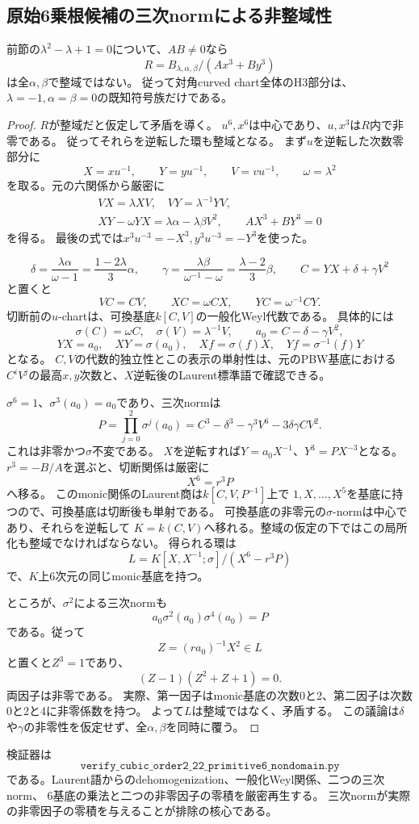 \subsection{原始6乗根候補の三次normによる非整域性}
\label{subsec:h3-order2-22-primitive6-nondomain}
\begin{theorem}\label{thm:h3-order2-22-primitive6-nondomain}
前節の$\lambda^2-\lambda+1=0$について、$AB\ne0$なら
\[
 R=B_{\lambda,\alpha,\beta}/(A x^3+B y^3)
\]
は全$\alpha,\beta$で整域ではない。
従って対角curved chart全体のH3部分は、$\lambda=-1,\alpha=\beta=0$の既知符号族だけである。
\end{theorem}
\begin{proof}
$R$が整域だと仮定して矛盾を導く。
$u^6,x^6$は中心であり、$u,x^3$は$R$内で非零である。
従ってそれらを逆転した環も整域となる。
まず$u$を逆転した次数零部分に
\[
 X=xu^{-1},\qquad Y=yu^{-1},\qquad V=vu^{-1},\qquad\omega=\lambda^2
\]
を取る。元の六関係から厳密に
\begin{gather*}
 VX=\lambda XV,\quad VY=\lambda^{-1}YV,\\
 XY-\omega YX=\lambda\alpha-\lambda\beta V^2,\qquad
 A X^3+B Y^3=0
\end{gather*}
を得る。
最後の式では$x^3u^{-3}=-X^3,y^3u^{-3}=-Y^3$を使った。

\[
 \delta=\frac{\lambda\alpha}{\omega-1}
       =\frac{1-2\lambda}{3}\alpha,\qquad
 \gamma=\frac{\lambda\beta}{\omega^{-1}-\omega}
       =\frac{\lambda-2}{3}\beta,
 \qquad C=YX+\delta+\gamma V^2
\]
と置くと
\[
 VC=CV,\qquad XC=\omega CX,\qquad YC=\omega^{-1}CY.
\]
切断前の$u$-chartは、可換基底$k[C,V]$の一般化Weyl代数である。
具体的には
\[
 \sigma(C)=\omega C,\quad\sigma(V)=\lambda^{-1}V,\qquad
 a_0=C-\delta-\gamma V^2,
\]
\[
 YX=a_0,\quad XY=\sigma(a_0),\quad
 Xf=\sigma(f)X,\quad Yf=\sigma^{-1}(f)Y
\]
となる。
$C,V$の代数的独立性とこの表示の単射性は、元のPBW基底における
$C^iV^j$の最高$x,y$次数と、$X$逆転後のLaurent標準語で確認できる。

$\sigma^6=1$、$\sigma^3(a_0)=a_0$であり、三次normは
\[
 P=\prod_{j=0}^2\sigma^j(a_0)
  =C^3-\delta^3-\gamma^3V^6-3\delta\gamma CV^2.
\]
これは非零かつ$\sigma$不変である。
$X$を逆転すれば$Y=a_0X^{-1}$、$Y^3=PX^{-3}$となる。
$r^3=-B/A$を選ぶと、切断関係は厳密に
\[
 X^6=r^3P
\]
へ移る。
このmonic関係のLaurent商は$k[C,V,P^{-1}]$上で
$1,X,\ldots,X^5$を基底に持つので、可換基底は切断後も単射である。
可換基底の非零元の$\sigma$-normは中心であり、それらを逆転して
$K=k(C,V)$へ移れる。整域の仮定の下ではこの局所化も整域でなければならない。
得られる環は
\[
 L=K[X,X^{-1};\sigma]/(X^6-r^3P)
\]
で、$K$上6次元の同じmonic基底を持つ。

ところが、$\sigma^2$による三次normも
\[
 a_0\sigma^2(a_0)\sigma^4(a_0)=P
\]
である。従って
\[
 Z=(r a_0)^{-1}X^2\in L
\]
と置くと$Z^3=1$であり、
\[
 (Z-1)(Z^2+Z+1)=0.
\]
両因子は非零である。
実際、第一因子はmonic基底の次数0と2、第二因子は次数0と2と4に非零係数を持つ。
よって$L$は整域ではなく、矛盾する。
この議論は$\delta$や$\gamma$の非零性を仮定せず、全$\alpha,\beta$を同時に覆う。
\end{proof}

検証器は
\[
 \texttt{verify\_cubic\_order2\_22\_primitive6\_nondomain.py}
\]
である。Laurent語からのdehomogenization、一般化Weyl関係、二つの三次norm、
6基底の乗法と二つの非零因子の零積を厳密再生する。
三次normが実際の非零因子の零積を与えることが排除の核心である。
